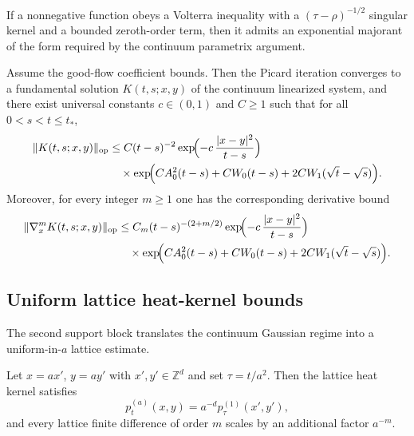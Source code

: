 \begin{lemma}
If a nonnegative function obeys a Volterra inequality with a $(\tau-\rho)^{-1/2}$ singular kernel and a bounded zeroth-order term, then it admits an exponential majorant of the form required by the continuum parametrix argument.
\end{lemma}

\begin{theorem}
Assume the good-flow coefficient bounds. Then the Picard iteration converges to a fundamental solution $K(t,s;x,y)$ of the continuum linearized system, and there exist universal constants $c\in(0,1)$ and $C\ge 1$ such that for all $0<s<t\le t_\ast$,
\begin{align*}
\|K(t,s;x,y)\|_{\mathrm{op}}
&\le C (t-s)^{-2}
\exp\!\Bigl(-c\,\frac{|x-y|^2}{t-s}\Bigr) \\
&\quad\times
\exp\!\Bigl(CA_0^2(t-s)+CW_0(t-s)+2CW_1(\sqrt t-\sqrt s)\Bigr).
\end{align*}
Moreover, for every integer $m\ge 1$ one has the corresponding derivative bound
\begin{align*}
\|\nabla_x^m K(t,s;x,y)\|_{\mathrm{op}}
&\le C_m (t-s)^{-(2+m/2)}
\exp\!\Bigl(-c\,\frac{|x-y|^2}{t-s}\Bigr) \\
&\quad\times
\exp\!\Bigl(CA_0^2(t-s)+CW_0(t-s)+2CW_1(\sqrt t-\sqrt s)\Bigr).
\end{align*}
\end{theorem}


\subsection{Uniform lattice heat-kernel bounds}
The second support block translates the continuum Gaussian regime into a uniform-in-$a$ lattice estimate.

\begin{lemma}
Let $x=ax'$, $y=ay'$ with $x',y'\in\mathbb Z^d$ and set $\tau=t/a^2$. Then the lattice heat kernel satisfies
\[
p_t^{(a)}(x,y)=a^{-d}p_\tau^{(1)}(x',y'),
\]
and every lattice finite difference of order $m$ scales by an additional factor $a^{-m}$.
\end{lemma}

